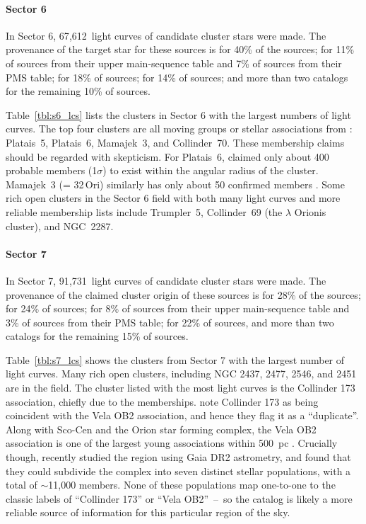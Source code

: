 \documentclass[12pt,twocolumn,tighten]{aastex62}
\newcommand{\sVInumberlcs}{67{,}612\ }  %
\newcommand{\sVIInumberlcs}{91{,}731\ }  %
\begin{document}
\paragraph{Sector 6}
In Sector 6, \sVInumberlcs light curves of candidate cluster stars
were made. The provenance of the target star for these
sources is \citet{dias_proper_2014} for 40\% of the sources;
\citet{zari_3d_2018} for 11\% of sources from their upper
main-sequence table and 7\% of sources from their PMS table;
\citet{Kharchenko_et_al_2013} for 18\% of sources;
\citet{cantat-gaudin_gaia_2018} for 14\% of sources; and more than two
catalogs for the remaining 10\% of sources.

Table~\ref{tbl:s6_lcs} lists the clusters in Sector 6 with the largest
numbers of light curves. The top four clusters are all moving groups
or stellar associations from \citet{dias_proper_2014}: Platais~5,
Platais~6, Mamajek~3, and Collinder~70.  These membership claims
should be regarded with skepticism.  For Platais~6,
\citet{Kharchenko_et_al_2013} claimed only about 400 probable members
(1$\sigma$) to exist within the angular radius of the cluster.
Mamajek~3 (= 32$\,$Ori) similarly has only about 50 confirmed members
\citep{bell_32ori_2017}.
Some rich open clusters in the Sector 6 field with
both many light curves and more reliable membership lists
include Trumpler~5,
Collinder~69 (the $\lambda$ Orionis cluster), and NGC~2287.


\paragraph{Sector 7}
In Sector 7, \sVIInumberlcs light curves of candidate cluster stars
were made.  The provenance of the claimed cluster origin of these
sources is \citet{dias_proper_2014} for 28\% of the sources;
\citet{Kharchenko_et_al_2013} for 24\% of sources;
\citet{zari_3d_2018} for 8\% of sources from their upper main-sequence
table and 3\% of sources from their PMS table;
\citet{cantat-gaudin_gaia_2018} for 22\% of sources, and more than two
catalogs for the remaining 15\% of sources.

Table~\ref{tbl:s7_lcs} shows the clusters from Sector 7 with the
largest number of light curves.  Many rich open clusters, including
NGC 2437, 2477, 2546, and 2451 are in the field.  The cluster listed
with the most light curves is the Collinder 173 association, chiefly
due to the \citet{dias_proper_2014} memberships.
\citet{Kharchenko_et_al_2013} note Collinder 173 as being coincident
with the Vela OB2 association, and hence they flag it as a
``duplicate''.  Along with Sco-Cen and the Orion star forming complex,
the Vela OB2 association is one of the largest young associations
within 500~pc \citep{zari_3d_2018}.  Crucially though,
\citet{cantat-gaudin_velaOB2_2019} recently studied the region using
Gaia DR2 astrometry, and found that they could subdivide the complex
into seven distinct stellar populations, with a total of $\sim$11,000
members.  None of these populations map one-to-one to the classic
labels of ``Collinder 173'' or ``Vela OB2''~--~so the
\citet{cantat-gaudin_velaOB2_2019} catalog is likely a more reliable
source of information for this particular region of the sky.
\end{document}

